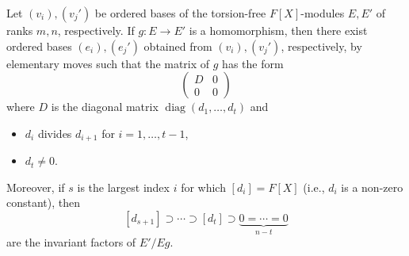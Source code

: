 Let $(v_i), (v_j')$ be ordered bases of the torsion-free $F[X]$-modules $E, E'$ of ranks $m, n$, respectively. If $g: E \to E'$ is a homomorphism, then there exist ordered bases $(e_i), (e_j')$ obtained from $(v_i), (v_j')$, respectively, by elementary moves such that the matrix of $g$ has the form
$$\begin{pmatrix} D & 0 \\ 0 & 0 \end{pmatrix}$$
where $D$ is the diagonal matrix $\operatorname{diag}(d_1, \ldots, d_t)$ and
\begin{itemize}
\item[(i)] $d_i$ divides $d_{i+1}$ for $i = 1, \ldots, t-1$,
\item[(ii)] $d_t \neq 0$.
\end{itemize}
Moreover, if $s$ is the largest index $i$ for which $[d_i] = F[X]$ (i.e., $d_i$ is a non-zero constant), then
$$[d_{s+1}] \supset \cdots \supset [d_t] \supset \underbrace{0 = \cdots = 0}_{n-t}$$
are the invariant factors of $E'/Eg$.

